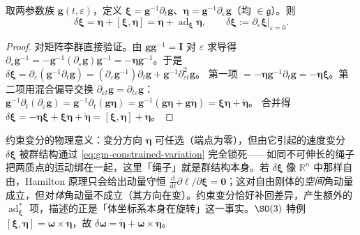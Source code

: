 \begin{lemma}[约束变分]\label{lem:gm-constrained-variation}
取两参数族 $\mathbf g(t,\varepsilon)$，定义 $\boldsymbol\xi=\mathbf g^{-1}\partial_t\mathbf g$、$\boldsymbol\eta=\mathbf g^{-1}\partial_\varepsilon\mathbf g$（均 $\in\mathfrak g$）。则
\begin{equation}
  \delta\boldsymbol\xi=\dot{\boldsymbol\eta}+[\boldsymbol\xi,\boldsymbol\eta]=\dot{\boldsymbol\eta}+\operatorname{ad}_{\boldsymbol\xi}\boldsymbol\eta,\qquad \delta\boldsymbol\xi:=\partial_\varepsilon\boldsymbol\xi|_{\varepsilon=0}.
  \label{eq:gm-constrained-variation}
\end{equation}
\end{lemma}

\begin{proof}
对矩阵李群直接验证。由 $\mathbf g\mathbf g^{-1}=\mathbf I$ 对 $\varepsilon$ 求导得 $\partial_\varepsilon\mathbf g^{-1}=-\mathbf g^{-1}(\partial_\varepsilon\mathbf g)\mathbf g^{-1}=-\boldsymbol\eta\mathbf g^{-1}$。于是
$\delta\boldsymbol\xi=\partial_\varepsilon(\mathbf g^{-1}\partial_t\mathbf g)=(\partial_\varepsilon\mathbf g^{-1})\partial_t\mathbf g+\mathbf g^{-1}\partial_{\varepsilon t}^2\mathbf g$。
第一项 $=-\boldsymbol\eta\mathbf g^{-1}\partial_t\mathbf g=-\boldsymbol\eta\boldsymbol\xi$。第二项用混合偏导交换 $\partial_{\varepsilon t}\mathbf g=\partial_{t\varepsilon}\mathbf g$：
$\mathbf g^{-1}\partial_t(\partial_\varepsilon\mathbf g)=\mathbf g^{-1}\partial_t(\mathbf g\boldsymbol\eta)=\mathbf g^{-1}(\dot{\mathbf g}\boldsymbol\eta+\mathbf g\dot{\boldsymbol\eta})=\boldsymbol\xi\boldsymbol\eta+\dot{\boldsymbol\eta}$。
合并得 $\delta\boldsymbol\xi=-\boldsymbol\eta\boldsymbol\xi+\boldsymbol\xi\boldsymbol\eta+\dot{\boldsymbol\eta}=[\boldsymbol\xi,\boldsymbol\eta]+\dot{\boldsymbol\eta}$。
\end{proof}

\begin{insight}
约束变分的物理意义：变分方向 $\boldsymbol\eta$ 可任选（端点为零），但由它引起的速度变分 $\delta\boldsymbol\xi$ 被群结构通过 \cref{eq:gm-constrained-variation} 完全锁死——如同不可伸长的绳子把两质点的运动绑在一起，这里「绳子」就是群结构本身。若 $\delta\boldsymbol\xi$ 像 $\mathbb R^n$ 中那样自由，Hamilton 原理只会给出动量守恒 $\tfrac{\mathrm d}{\mathrm dt}\partial\ell/\partial\boldsymbol\xi=\mathbf0$；这对自由刚体的\emph{空间}角动量成立，但对\emph{体}角动量不成立（其方向在变）。约束变分恰好补回差异，产生额外的 $\operatorname{ad}^*_{\boldsymbol\xi}$ 项，描述的正是「体坐标系本身在旋转」这一事实。$\SO(3)$ 特例 $[\boldsymbol\xi,\boldsymbol\eta]=\boldsymbol\omega\times\boldsymbol\eta$，故 $\delta\boldsymbol\omega=\dot{\boldsymbol\eta}+\boldsymbol\omega\times\boldsymbol\eta$。
\end{insight}

